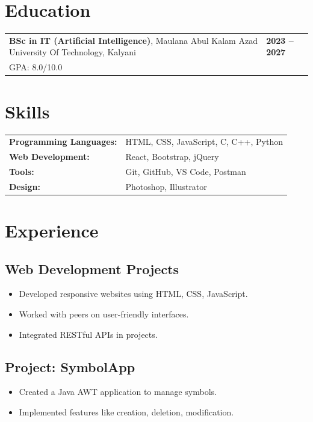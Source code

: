 \documentclass{article}
\begin{document}
\section*{Education}
\begin{tabular}{p{} p{}}
    \textbf{BSc in IT (Artificial Intelligence)}, Maulana Abul Kalam Azad University Of Technology, Kalyani & \hfill \textbf{2023 -- 2027} \\
    GPA: 8.0/10.0 & \\
\end{tabular}

\section*{Skills}
\begin{tabular}{p{} p{}}
    \textbf{Programming Languages:} & HTML, CSS, JavaScript, C, C++, Python \\
    \textbf{Web Development:} & React, Bootstrap, jQuery \\
    \textbf{Tools:} & Git, GitHub, VS Code, Postman \\
    \textbf{Design:} & Photoshop, Illustrator \\
\end{tabular}

\section*{Experience}
\subsection*{Web Development Projects}
\begin{itemize}[leftmargin=0.5cm]
    \item Developed responsive websites using HTML, CSS, JavaScript.
    \item Worked with peers on user-friendly interfaces.
    \item Integrated RESTful APIs in projects.
\end{itemize}

\subsection*{Project: SymbolApp}
\begin{itemize}[leftmargin=0.5cm]
    \item Created a Java AWT application to manage symbols.
    \item Implemented features like creation, deletion, modification.
\end{itemize}
\end{document}
